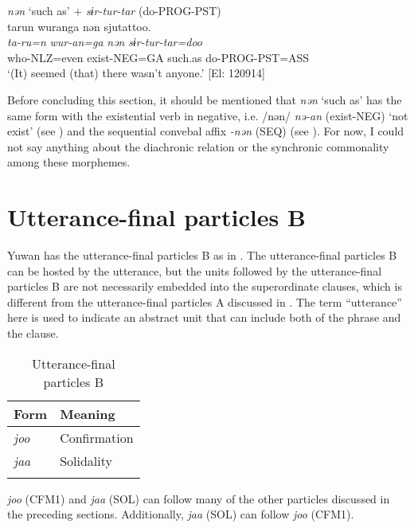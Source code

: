 \begin{xlist}
  \ex \textit{nən} ‘such as’ + \textit{sɨr-tur-tar} (do-PROG-PST)\\
      \glll    tarun  wuranga  nən  sjutattoo.\\
    \textit{ta-ru=n}  \textit{wur-an=ga}  \textit{nən}  \textit{sɨr-tur-tar=doo}\\
    who-NLZ=even  exist-NEG=GA  such.as  do-PROG-PST=ASS\\
    \glt     ‘(It) seemed (that) there wasn’t anyone.’ [El: 120914]
    \z
\z

  Before concluding this section, it should be mentioned that \textit{nən} ‘such as’ has the same form with the existential verb in negative, i.e. /nən/ \textit{nə-an} (exist-NEG) ‘not exist’ (see ) and the sequential convebal affix \textit{{}-nən} (SEQ) (see ). For now, I could not say anything about the diachronic relation or the synchronic commonality among these morphemes.

\section{Utterance-final particles B}\label{sec:10.5}

Yuwan has the utterance-final particles B as in . The utterance-final particles B can be hosted by the utterance, but the units followed by the utterance-final particles B are not necessarily embedded into the superordinate clauses, which is different from the utterance-final particles A discussed in . The term “utterance” here is used to indicate an abstract unit that can include both of the phrase and the clause.

\begin{table}
\caption{Utterance-final particles B\label{tab:101}}
\begin{tabular}{ll}
\lsptoprule
Form & Meaning\\\midrule
\textit{joo} &  Confirmation\\
\textit{jaa} &  Solidality\\\lspbottomrule
\end{tabular}
\end{table}

\textit{joo} (CFM1) and \textit{jaa} (SOL) can follow many of the other particles discussed in the preceding sections. Additionally, \textit{jaa} (SOL) can follow \textit{joo} (CFM1).


\end{xlist}
